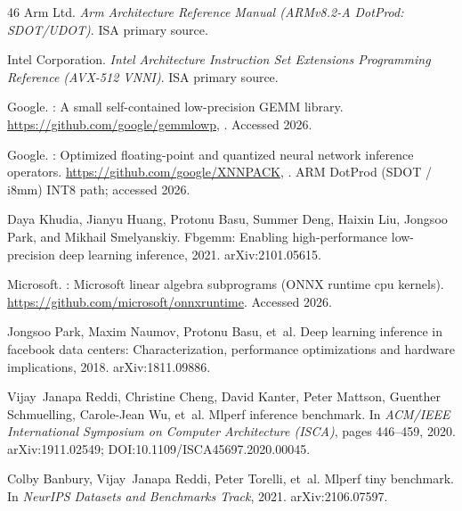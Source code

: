 \documentclass[11pt]{article}
\begin{document}
\begin{thebibliography}{46}
{Arm Ltd.}
\newblock \emph{Arm Architecture Reference Manual (ARMv8.2-A DotProd: SDOT/UDOT)}.
\newblock ISA primary source.

{Intel Corporation}.
\newblock \emph{Intel Architecture Instruction Set Extensions Programming Reference (AVX-512 VNNI)}.
\newblock ISA primary source.

{Google}.
: A small self-contained low-precision {GEMM} library.
\newblock \url{https://github.com/google/gemmlowp}, {}.
\newblock Accessed 2026.

{Google}.
: Optimized floating-point and quantized neural network inference operators.
\newblock \url{https://github.com/google/XNNPACK}, {}.
\newblock ARM DotProd (SDOT / i8mm) INT8 path; accessed 2026.

Daya Khudia, Jianyu Huang, Protonu Basu, Summer Deng, Haixin Liu, Jongsoo Park, and Mikhail Smelyanskiy.
\newblock Fbgemm: Enabling high-performance low-precision deep learning inference, 2021.
\newblock arXiv:2101.05615.

{Microsoft}.
: Microsoft linear algebra subprograms ({ONNX} runtime cpu kernels).
\newblock \url{https://github.com/microsoft/onnxruntime}.
\newblock Accessed 2026.

Jongsoo Park, Maxim Naumov, Protonu Basu, et~al.
\newblock Deep learning inference in facebook data centers: Characterization, performance optimizations and hardware implications, 2018.
\newblock arXiv:1811.09886.

Vijay~Janapa Reddi, Christine Cheng, David Kanter, Peter Mattson, Guenther Schmuelling, Carole-Jean Wu, et~al.
\newblock Mlperf inference benchmark.
\newblock In \emph{ACM/IEEE International Symposium on Computer Architecture (ISCA)}, pages 446--459, 2020.
\newblock arXiv:1911.02549; DOI:10.1109/ISCA45697.2020.00045.

Colby Banbury, Vijay~Janapa Reddi, Peter Torelli, et~al.
\newblock Mlperf tiny benchmark.
\newblock In \emph{NeurIPS Datasets and Benchmarks Track}, 2021.
\newblock arXiv:2106.07597.


\end{thebibliography}
\end{document}
